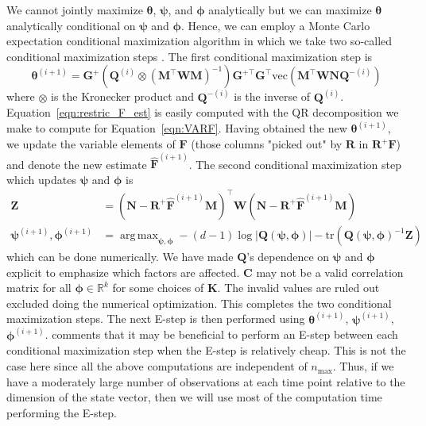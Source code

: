 \documentclass[notitlepage]{article}
\DeclareMathOperator*{\argmax}{arg\,max}
\renewcommand{\vec}[1]{\bm{#1}}
\newcommand{\mat}[1]{\mathbf{#1}}
\newcommand{\Lparen}[1]{\left( #1\right)}
\newcommand{\Lvert}[1]{\left\vert #1\right\vert}
\newcommand{\optor}[2]{#1\Lparen{#2}}
\newcommand{\vecOP}[1]{\optor{\text{vec}}{#1}}
\newcommand{\nPeriods}{d}
\newcommand{\nMax}{n_{\text{max}}}
\begin{document}
We cannot jointly maximize $\vec{\theta}$, $\vec{\psi}$, and $\vec{\phi}$ analytically but we can maximize $\vec{\theta}$ analytically conditional on $\vec{\psi}$ and $\vec{\phi}$. Hence, we can employ a Monte Carlo expectation conditional maximization algorithm in which we take two so-called conditional maximization steps \citep[see][on the, non-Monte Carlo, expectation maximization algorithm]{meng93}. 
The first conditional maximization step is %
%
\begin{equation}\label{eqn:restric_F_est}
\vec{\theta}^{(i + 1)} =
	\mat{G}^+
	\Lparen{\mat{Q}^{(i)} \otimes \Lparen{\mat{M}^\top\mat{W}\mat{M}}^{-1}}
	\mat{G}^{+\top}\mat{G}^\top	
	\vecOP{\mat{M}^\top\mat{W}\mat{N}\mat{Q}^{-(i)}}
\end{equation}%
% 
where $\otimes$ is the Kronecker product and $\mat{Q}^{-(i)}$ is the inverse 
of $\mat{Q}^{(i)}$. Equation~\eqref{eqn:restric_F_est} is easily computed 
with the QR decomposition we 
make to compute for Equation~\eqref{eqn:VARF}. Having obtained the new 
$\vec{\theta}^{(i + 1)}$, we update the variable elements of $\mat{F}$ (those 
columns "picked out" by $\mat{R}$ in $\mat{R}^+\mat{F}$) and denote the new 
estimate $\widehat{\mat{F}}^{(i + 1)}$. The second conditional maximization 
step which updates $\vec{\psi}$ and $\vec{\phi}$ is %
%
\begin{align*}
\mat{Z} &= \Lparen{\mat{N} - \mat{R}^+\widehat{\mat{F}}^{(i +1)}\mat{M}}^\top\mat{W}
           \Lparen{\mat{N} - \mat{R}^+\widehat{\mat{F}}^{(i +1)}\mat{M}} \\
\vec{\psi}^{(i+1)},\vec{\phi}^{(i+1)} &= \argmax_{\vec{\psi},\vec{\phi}} 
   -(\nPeriods - 1)\log\Lvert{\mat{Q}(\vec{\psi},\vec{\phi})}
   -\text{tr}\Lparen{\mat{Q}(\vec{\psi},\vec{\phi})^{-1}\mat{Z}}
\end{align*}%
% 
which can be done numerically. We have made $\mat{Q}$'s dependence on $\vec{\psi}$ and $\vec{\phi}$ explicit to emphasize which factors are affected. $\mat{C}$ may not be a valid correlation matrix for all $\vec\phi\in\mathbb{R}^k$ for some choices of $\mat{K}$. The invalid values are ruled out excluded doing the numerical optimization. This completes the two conditional maximization steps. The next E-step is then performed using $\vec{\theta}^{(i + 1)}$, $\vec{\psi}^{(i +1)}$, $\vec{\phi}^{(i + 1)}$. \citet[][see the discussion]{meng93} comments that it may be beneficial to perform an E-step between each conditional maximization step when the E-step is relatively cheap. 
This is not the case here since all the above computations are independent 
of $\nMax$.
Thus, if we have a moderately large number of observations at each time point relative to 
the dimension of the state vector, then we will use most of the 
computation time performing the E-step.
\end{document}
